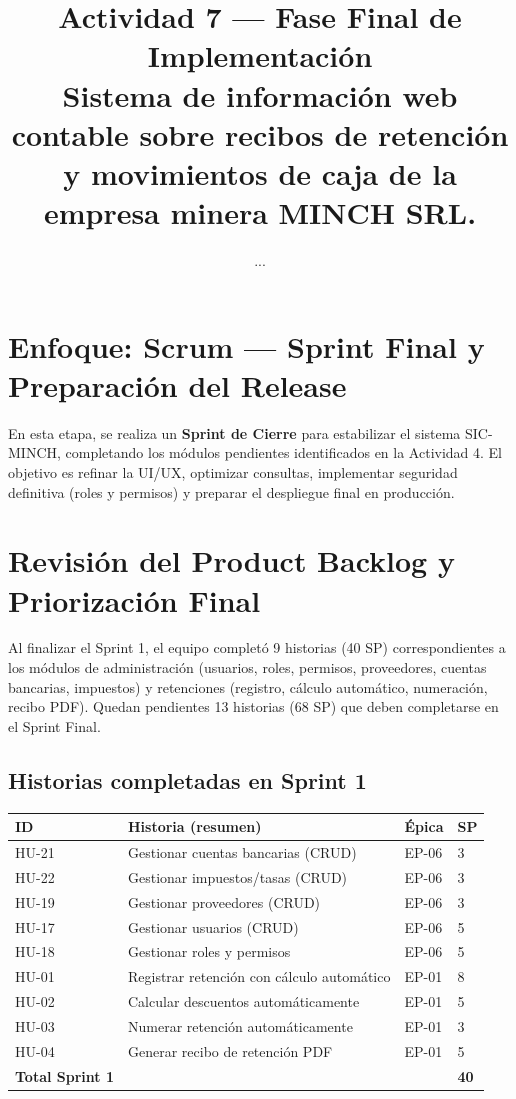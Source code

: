 \documentclass[stu]{apa7}
\title{Actividad 7 --- Fase Final de Implementación \\ Sistema de información web contable sobre recibos de retención y movimientos de caja de la empresa minera MINCH SRL.}
\author{...}
\affiliation{...}
\begin{document}
\maketitle

\section*{Enfoque: Scrum --- Sprint Final y Preparación del Release}

En esta etapa, se realiza un \textbf{Sprint de Cierre} para estabilizar el sistema SIC-MINCH, completando los módulos pendientes identificados en la Actividad 4. El objetivo es refinar la UI/UX, optimizar consultas, implementar seguridad definitiva (roles y permisos) y preparar el despliegue final en producción.

\section{Revisión del Product Backlog y Priorización Final}

Al finalizar el Sprint 1, el equipo completó 9 historias (40 SP) correspondientes a los módulos de administración (usuarios, roles, permisos, proveedores, cuentas bancarias, impuestos) y retenciones (registro, cálculo automático, numeración, recibo PDF). Quedan pendientes 13 historias (68 SP) que deben completarse en el Sprint Final.

\subsection{Historias completadas en Sprint 1}

\begin{longtable}{|C{1cm}|L{4.5cm}|C{2cm}|C{1.5cm}|}
\hline
{}
\textbf{ID} & \textbf{Historia (resumen)} & \textbf{Épica} & \textbf{SP} \\
\hline
HU-21 & Gestionar cuentas bancarias (CRUD) & EP-06 & 3 \\
\hline
HU-22 & Gestionar impuestos/tasas (CRUD) & EP-06 & 3 \\
\hline
HU-19 & Gestionar proveedores (CRUD) & EP-06 & 3 \\
\hline
HU-17 & Gestionar usuarios (CRUD) & EP-06 & 5 \\
\hline
HU-18 & Gestionar roles y permisos & EP-06 & 5 \\
\hline
HU-01 & Registrar retención con cálculo automático & EP-01 & 8 \\
\hline
HU-02 & Calcular descuentos automáticamente & EP-01 & 5 \\
\hline
HU-03 & Numerar retención automáticamente & EP-01 & 3 \\
\hline
HU-04 & Generar recibo de retención PDF & EP-01 & 5 \\
\hline
{}
\textbf{Total Sprint 1} & & & \textbf{40} \\
\hline
\end{longtable}
\end{document}
